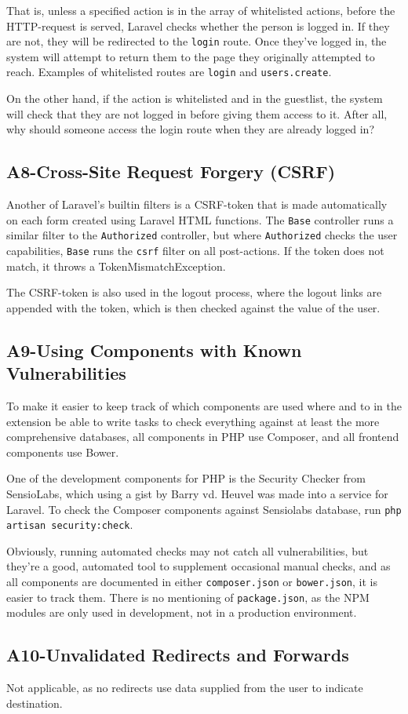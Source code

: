 That is, unless a specified action is in the array of whitelisted actions, before the HTTP-request is served, Laravel checks whether the person is logged in. If they are not, they will be redirected to the \texttt{login} route. Once they've logged in, the system will attempt to return them to the page they originally attempted to reach. Examples of whitelisted routes are \texttt{login} and \texttt{users.create}.

On the other hand, if the action is whitelisted and in the guestlist, the system will check that they are not logged in before giving them access to it. After all, why should someone access the login route when they are already logged in?

\subsection{A8-Cross-Site Request Forgery (CSRF)}
\noindent
Another of Laravel's builtin filters is a CSRF-token that is made automatically on each form created using Laravel HTML functions. The \texttt{Base} controller runs a similar filter to the \texttt{Authorized} controller, but where \texttt{Authorized} checks the user capabilities, \texttt{Base} runs the \texttt{csrf} filter on all post-actions. If the token does not match, it throws a TokenMismatchException.

The CSRF-token is also used in the logout process, where the logout links are appended with the token, which is then checked against the value of the user.

\subsection{A9-Using Components with Known Vulnerabilities}
\noindent
To make it easier to keep track of which components are used where and to in the extension be able to write tasks to check everything against at least the more comprehensive databases, all components in PHP use
Composer, and all frontend components use Bower.

One of the development components for PHP is the Security
Checker\citep{SecurityCheck2013} from SensioLabs, which using a gist by Barry vd. Heuvel\citep{Gist2013bvh} was made into a service for Laravel. To check the Composer
components against Sensiolabs database, run \texttt{php artisan security:check}.

Obviously, running automated checks may not catch all vulnerabilities, but they're a good, automated tool to supplement occasional manual checks, and as all components are documented in either \texttt{composer.json} or \texttt{bower.json}, it is easier to track them. There is no mentioning of \texttt{package.json}, as the NPM modules are only used in development, not in a production environment.

\subsection{A10-Unvalidated Redirects and Forwards}
\noindent
Not applicable, as no redirects use data supplied from the user to indicate destination.


